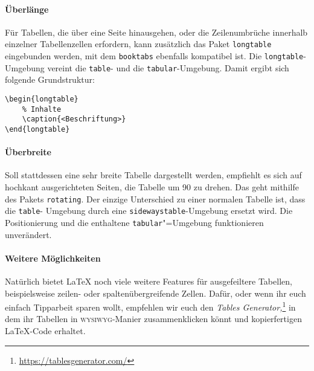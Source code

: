 \paragraph{Überlänge}
Für Tabellen, die über eine Seite hinausgehen, oder die Zeilenumbrüche innerhalb einzelner Tabellenzellen erfordern, kann zusätzlich das Paket \texttt{longtable} eingebunden werden, mit dem \texttt{booktabs} ebenfalls kompatibel ist.
Die \texttt{longtable}-Umgebung vereint die \texttt{table}- und die \texttt{tabular}-Umgebung.
Damit ergibt sich folgende Grundstruktur:

\begin{verbatim}
\begin{longtable}
    % Inhalte
    \caption{<Beschriftung>}
\end{longtable}
\end{verbatim}

\paragraph{Überbreite}
Soll stattdessen eine sehr breite Tabelle dargestellt werden, empfiehlt es sich auf hochkant ausgerichteten Seiten, die Tabelle um 90\textdegree{} zu drehen.
Das geht mithilfe des Pakets \texttt{rotating}.
Der einzige Unterschied zu einer normalen Tabelle ist, dass die \texttt{table}- Umgebung durch eine \texttt{sidewaystable}-Umgebung ersetzt wird.
Die Positionierung und die enthaltene \texttt{tabular}"=Umgebung funktionieren unverändert.

\paragraph{Weitere Möglichkeiten}
Natürlich bietet \LaTeX{} noch viele weitere Features für ausgefeiltere Tabellen, beispielsweise zeilen- oder spaltenübergreifende Zellen. 
Dafür, oder wenn ihr euch einfach Tipparbeit sparen wollt, empfehlen wir euch den \emph{Tables Generator,}\footnote{\url{https://tablesgenerator.com/}} in dem ihr Tabellen in \textsc{wysiwyg}-Manier zusammenklicken könnt und kopierfertigen \LaTeX-Code erhaltet.


